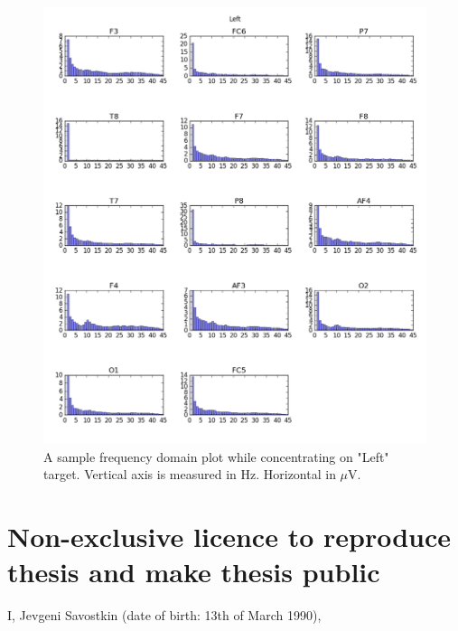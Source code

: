 \documentclass[12pt]{article}
\begin{document}
\begin{figure} [H]
\begin{center}
\includegraphics[width=1\textwidth]{left_amplitudes}
\caption{A sample frequency domain plot while concentrating on "Left" target. Vertical axis is measured in Hz. Horizontal in $\mu$V.}
\end{center}
\end{figure}

\pagebreak
\section*{\small Non-exclusive licence to reproduce thesis and make thesis public}


I, Jevgeni Savostkin (date of birth: 13th of March 1990),
\end{document}
